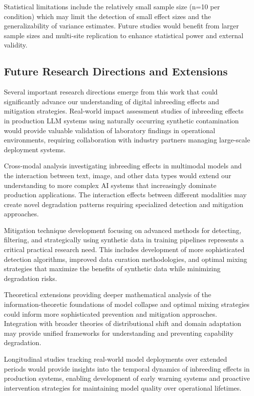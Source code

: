 \documentclass{article}
\begin{document}
Statistical limitations include the relatively small sample size (n=10 per condition) which may limit the detection of small effect sizes and the generalizability of variance estimates. Future studies would benefit from larger sample sizes and multi-site replication to enhance statistical power and external validity.

\subsection{Future Research Directions and Extensions}

Several important research directions emerge from this work that could significantly advance our understanding of digital inbreeding effects and mitigation strategies. Real-world impact assessment studies of inbreeding effects in production LLM systems using naturally occurring synthetic contamination would provide valuable validation of laboratory findings in operational environments, requiring collaboration with industry partners managing large-scale deployment systems.

Cross-modal analysis investigating inbreeding effects in multimodal models and the interaction between text, image, and other data types would extend our understanding to more complex AI systems that increasingly dominate production applications. The interaction effects between different modalities may create novel degradation patterns requiring specialized detection and mitigation approaches.

Mitigation technique development focusing on advanced methods for detecting, filtering, and strategically using synthetic data in training pipelines represents a critical practical research need. This includes development of more sophisticated detection algorithms, improved data curation methodologies, and optimal mixing strategies that maximize the benefits of synthetic data while minimizing degradation risks.

Theoretical extensions providing deeper mathematical analysis of the information-theoretic foundations of model collapse and optimal mixing strategies could inform more sophisticated prevention and mitigation approaches. Integration with broader theories of distributional shift and domain adaptation may provide unified frameworks for understanding and preventing capability degradation.

Longitudinal studies tracking real-world model deployments over extended periods would provide insights into the temporal dynamics of inbreeding effects in production systems, enabling development of early warning systems and proactive intervention strategies for maintaining model quality over operational lifetimes.
\end{document}
